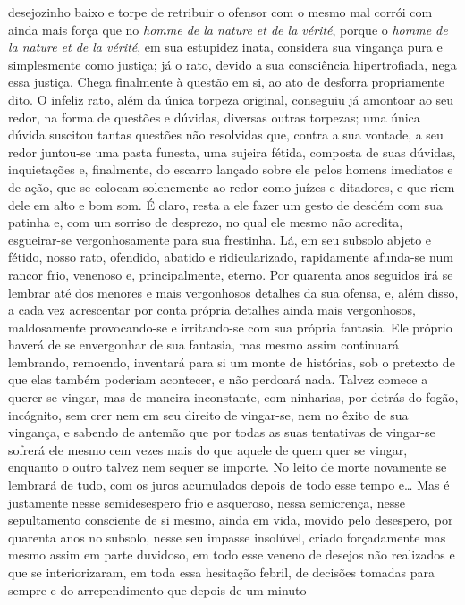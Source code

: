 desejozinho baixo e torpe de retribuir o ofensor com o mesmo mal corrói com
ainda mais força que no \textit{homme de la nature et de la vérité}, porque o
\textit{homme de la nature et de la vérité}, em sua estupidez inata, considera
sua vingança pura e simplesmente como justiça; já o rato, devido a sua
consciência hipertrofiada, nega essa justiça. Chega finalmente à questão em si,
ao ato de desforra propriamente dito. O infeliz rato, além da única torpeza
original, conseguiu já amontoar ao seu redor, na forma de questões e dúvidas,
diversas outras torpezas; uma única dúvida suscitou tantas questões não
resolvidas que, contra a sua vontade, a seu redor juntou-se uma pasta funesta,
uma sujeira fétida, composta de suas dúvidas, inquietações e, finalmente, do
escarro lançado sobre ele pelos homens imediatos e de ação, que se colocam
solenemente ao redor como juízes e ditadores, e que riem dele em alto e bom
som. É claro, resta a ele fazer um gesto de desdém com sua patinha e, com um
sorriso de desprezo, no qual ele mesmo não acredita, esgueirar-se
vergonhosamente para sua frestinha. Lá, em seu subsolo abjeto e fétido, nosso
rato, ofendido, abatido e ridicularizado, rapidamente afunda-se num rancor
frio, venenoso e, principalmente, eterno. Por quarenta anos seguidos irá se
lembrar até dos menores e mais vergonhosos detalhes da sua ofensa, e, além
disso, a cada vez acrescentar por conta própria detalhes ainda mais
vergonhosos, maldosamente provocando-se e irritando-se com sua própria
fantasia. Ele próprio haverá de se envergonhar de sua fantasia, mas mesmo assim
continuará lembrando, remoendo, inventará para si um monte de histórias, sob o
pretexto de que elas também poderiam acontecer, e não perdoará nada. Talvez
comece a querer se vingar, mas de maneira inconstante, com ninharias, por
detrás do fogão, incógnito, sem crer nem em seu direito de vingar-se, nem no
êxito de sua vingança, e sabendo de antemão que por todas as suas tentativas de
vingar-se sofrerá ele mesmo cem vezes mais do que aquele de quem quer se
vingar, enquanto o outro talvez nem sequer se importe. No leito de morte
novamente se lembrará de tudo, com os juros acumulados depois de todo esse
tempo e\ldots{} Mas é justamente nesse semidesespero frio e asqueroso, nessa
semicrença, nesse sepultamento consciente de si mesmo, ainda em vida, movido
pelo desespero, por quarenta anos no subsolo, nesse seu impasse insolúvel,
criado forçadamente mas mesmo assim em parte duvidoso, em todo esse veneno de
desejos não realizados e que se interiorizaram, em toda essa hesitação febril,
de decisões tomadas para sempre e do arrependimento que depois de um minuto
